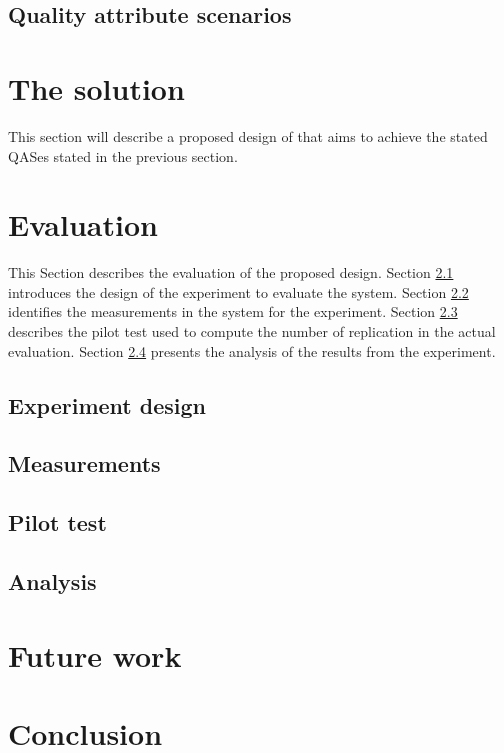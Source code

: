 \documentclass[conference]{IEEEtran}
\begin{document}
\subsection{Quality attribute scenarios}
\label{sec:qas}










\section{The solution}
\label{sec:middleware_architecture}


This section will describe a proposed design of that aims to achieve the stated QASes stated in the previous section.






\section{Evaluation}
\label{sec:evaluation}
This Section describes the evaluation of the proposed design.
Section \ref{sec:design} introduces the design of the experiment to evaluate the system.
Section \ref{sec:measurements} identifies the measurements in the system for the experiment.
Section \ref{sec:pilot_test} describes the pilot test used to compute the number of replication in the actual evaluation.
Section \ref{sec:analysis} presents the analysis of the results from the experiment.


\subsection{Experiment design}
\label{sec:design}


\subsection{Measurements}
\label{sec:measurements}


\subsection{Pilot test}
\label{sec:pilot_test}

\subsection{Analysis}
\label{sec:analysis}


\section{Future work}


\section{Conclusion}




\vspace{12pt}
\end{document}
